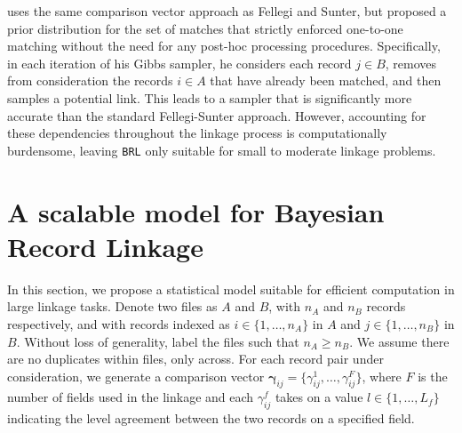 \documentclass[12pt,letterpaper]{article}
\newcommand{\1}[1]{\mathbb{I}\!\left[#1\right]} %
\begin{document}
\citep{sadinle2017} uses the same comparison vector approach as Fellegi and Sunter, but proposed a prior distribution for the set of matches that strictly enforced one-to-one matching without the need for any post-hoc processing procedures. Specifically, in each iteration of his Gibbs sampler, he considers each record \(j\in B\), removes from consideration the records \(i\in A\) that have already been matched, and then samples a potential link. This leads to a sampler that is significantly more accurate than the standard Fellegi-Sunter approach. However,
accounting for these dependencies throughout the linkage process is
computationally burdensome, leaving \texttt{BRL} only suitable for small
to moderate linkage problems.


\section{A scalable model for Bayesian Record Linkage}
\label{sec:model}

In this section, we propose a statistical model suitable for efficient computation in large linkage tasks. Denote two files as \(A\) and \(B\), with \(n_A\) and \(n_B\) records
respectively, and with records indexed as \(i \in \{1, \ldots, n_A\}\)
in \(A\) and \(j \in \{1, \ldots, n_B\}\) in \(B\). Without loss of
generality, label the files such that \(n_A \geq n_B\). We assume there
are no duplicates within files, only across. For each record pair under
consideration, we generate a comparison vector
\(\boldsymbol{\gamma}_{ij} = \{\gamma_{ij}^1, \ldots, \gamma_{ij}^F\}\),
where \(F\) is the number of fields used in the linkage and each
\(\gamma_{ij}^f\) takes on a value \(l \in \{1, \ldots, L_f\}\)
indicating the level agreement between the two records on a specified
field.
\end{document}
